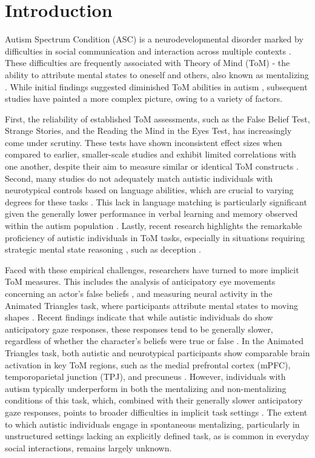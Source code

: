 \thispagestyle{empty}

\newpage

\section{Introduction}
Autism Spectrum Condition (ASC) is a neurodevelopmental disorder marked by difficulties in social communication and interaction across multiple contexts \citep{apa2013}. These difficulties are frequently associated with Theory of Mind (ToM) - the ability to attribute mental states to oneself and others, also known as mentalizing \citep{premack1978,wimmer1983}. While initial findings suggested diminished ToM abilities in autism \citep{baron-cohen1985,happe1994}, subsequent studies have painted a more complex picture, owing to a variety of factors. 

First, the reliability of established ToM assessments, such as the False Belief Test, Strange Stories, and the Reading the Mind in the Eyes Test, has increasingly come under scrutiny. These tests have shown inconsistent effect sizes when compared to earlier, smaller-scale studies and exhibit limited correlations with one another, despite their aim to measure similar or identical ToM constructs \citep{gernsbacher2019,higgins2024,schaafsma2015,yeung2024}. Second, many studies do not adequately match autistic individuals with neurotypical controls based on language abilities, which are crucial to varying degrees for these tasks \citep{betz2019}. This lack in language matching is particularly significant given the generally lower performance in verbal learning and memory observed within the autism population \citep{velikonja2019}. Lastly, recent research highlights the remarkable proficiency of autistic individuals in ToM tasks, especially in situations requiring strategic mental state reasoning \citep{bowler1992,pantelis2017}, such as deception \citep{vantiel2021}.

Faced with these empirical challenges, researchers have turned to more implicit ToM measures. This includes the analysis of anticipatory eye movements concerning an actor's false beliefs \citep{senju2009}, and measuring neural activity in the Animated Triangles task, where participants attribute mental states to moving shapes \citep{abell2000}. Recent findings indicate that while autistic individuals do show anticipatory gaze responses, these responses tend to be generally slower, regardless of whether the character's beliefs were true or false \citep{glenwright2021,schuwerk2016}. In the Animated Triangles task, both autistic and neurotypical participants show comparable brain activation in key ToM regions, such as the medial prefrontal cortex (mPFC), temporoparietal junction (TPJ), and precuneus \citep{moessnang2020}. However, individuals with autism typically underperform in both the mentalizing and non-mentalizing conditions of this task, which, combined with their generally slower anticipatory gaze responses, points to broader difficulties in implicit task settings \citep{wilson2021}. The extent to which autistic individuals engage in spontaneous mentalizing, particularly in unstructured settings lacking an explicitly defined task, as is common in everyday social interactions, remains largely unknown.

